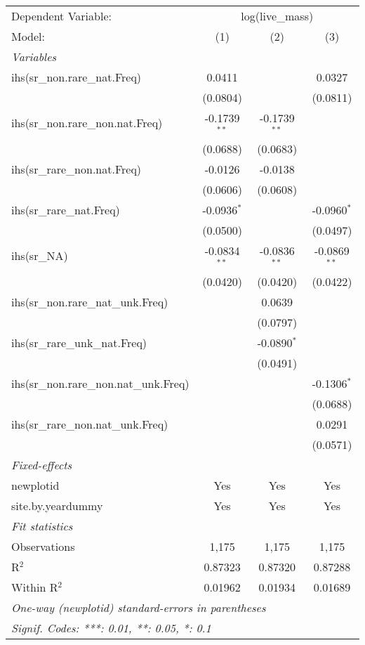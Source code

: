 \begin{tabular}{lccc}
\tabularnewline\midrule\midrule
Dependent Variable:&\multicolumn{3}{c}{log(live\_mass)}\\
Model:&(1) & (2) & (3)\\
\midrule \emph{Variables}&   &   &  \\
ihs(sr\_non.rare\_nat.Freq)&0.0411 &    & 0.0327\\
  &(0.0804) &    & (0.0811)\\
ihs(sr\_non.rare\_non.nat.Freq)&-0.1739$^{**}$ & -0.1739$^{**}$ &   \\
  &(0.0688) & (0.0683) &   \\
ihs(sr\_rare\_non.nat.Freq)&-0.0126 & -0.0138 &   \\
  &(0.0606) & (0.0608) &   \\
ihs(sr\_rare\_nat.Freq)&-0.0936$^{*}$ &    & -0.0960$^{*}$\\
  &(0.0500) &    & (0.0497)\\
ihs(sr\_NA)&-0.0834$^{**}$ & -0.0836$^{**}$ & -0.0869$^{**}$\\
  &(0.0420) & (0.0420) & (0.0422)\\
ihs(sr\_non.rare\_nat\_unk.Freq)&   & 0.0639 &   \\
  &   & (0.0797) &   \\
ihs(sr\_rare\_unk\_nat.Freq)&   & -0.0890$^{*}$ &   \\
  &   & (0.0491) &   \\
ihs(sr\_non.rare\_non.nat\_unk.Freq)&   &    & -0.1306$^{*}$\\
  &   &    & (0.0688)\\
ihs(sr\_rare\_non.nat\_unk.Freq)&   &    & 0.0291\\
  &   &    & (0.0571)\\
\midrule \emph{Fixed-effects}&   &   &  \\
newplotid & Yes & Yes & Yes\\
site.by.yeardummy & Yes & Yes & Yes\\
\midrule \emph{Fit statistics}&  & & \\
Observations & 1,175&1,175&1,175\\
R$^2$ & 0.87323&0.87320&0.87288\\
Within R$^2$ & 0.01962&0.01934&0.01689\\
\midrule\midrule\multicolumn{4}{l}{\emph{One-way (newplotid) standard-errors in parentheses}}\\
\multicolumn{4}{l}{\emph{Signif. Codes: ***: 0.01, **: 0.05, *: 0.1}}\\
\end{tabular}


